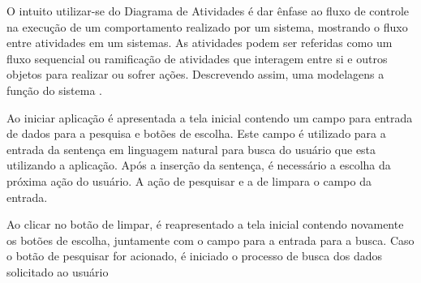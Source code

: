 O intuito utilizar-se do Diagrama de Atividades é dar ênfase ao fluxo de controle na execução de um comportamento realizado por um sistema, mostrando o fluxo entre atividades em um sistemas. As atividades podem ser referidas como um fluxo sequencial ou ramificação de atividades que interagem entre si e outros objetos para realizar ou sofrer ações. Descrevendo assim, uma modelagens a função do sistema \cite{Booch:2012}.  

Ao iniciar aplicação é apresentada a tela inicial contendo um campo para entrada de dados para a pesquisa e botões de escolha. Este campo é utilizado para a entrada da sentença em linguagem natural para busca do usuário que esta utilizando a aplicação. Após a inserção da sentença, é necessário a escolha da próxima ação do usuário. A ação de pesquisar e a de limpara o campo da entrada.

Ao clicar no botão de limpar, é reapresentado a tela inicial contendo novamente os botões de escolha, juntamente com o campo para a entrada para a busca. Caso o botão de pesquisar for acionado, é iniciado o processo de busca dos dados solicitado ao usuário
